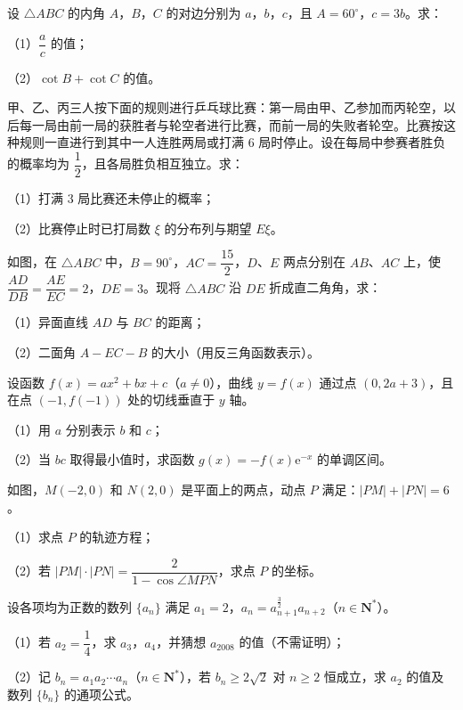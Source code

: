 \begin{question}
设 $\triangle ABC$ 的内角 $A$，$B$，$C$ 的对边分别为 $a$，$b$，$c$，且 $A=60^\circ$，$c=3b$。求：

（1）$\dfrac ac$ 的值；

（2）$\cot B+\cot C$ 的值。

\end{question}
\begin{question}
甲、乙、丙三人按下面的规则进行乒乓球比赛：第一局由甲、乙参加而丙轮空，以后每一局由前一局的获胜者与轮空者进行比赛，而前一局的失败者轮空。比赛按这种规则一直进行到其中一人连胜两局或打满 $6$ 局时停止。设在每局中参赛者胜负的概率均为 $\dfrac12$，且各局胜负相互独立。求：

（1）打满 $3$ 局比赛还未停止的概率；

（2）比赛停止时已打局数 $\xi$ 的分布列与期望 $E\xi$。

\Needspace{0.4\textheight}
\end{question}
\begin{question}
如图，在 $\triangle ABC$ 中，$B=90^\circ$，$AC=\dfrac{15}2$，$D$、$E$ 两点分别在 $AB$、$AC$ 上，使 $\dfrac{AD}{DB}=\dfrac{AE}{EC}=2$，$DE=3$。现将 $\triangle ABC$ 沿 $DE$ 折成直二角角，求：

（1）异面直线 $AD$ 与 $BC$ 的距离；

（2）二面角 $A-EC-B$ 的大小（用反三角函数表示）。
\nopagebreak[4]
\begin{center}\end{center}
\nopagebreak[4]
\end{question}
\begin{question}
设函数 $f(x)=ax^2+bx+c$（$a\neq0$），曲线 $y=f(x)$ 通过点 $(0,2a+3)$，且在点 $(-1,f(-1))$ 处的切线垂直于 $y$ 轴。

（1）用 $a$ 分别表示 $b$ 和 $c$；

（2）当 $bc$ 取得最小值时，求函数 $g(x)=-f(x)\mathrm e^{-x}$ 的单调区间。

\Needspace{0.4\textheight}
\end{question}
\begin{question}
如图，$M(-2,0)$ 和 $N(2,0)$ 是平面上的两点，动点 $P$ 满足：$|PM|+|PN|=6$。

（1）求点 $P$ 的轨迹方程；

（2）若 $|PM|\cdot|PN|=\dfrac2{1-\cos\angle MPN}$，求点 $P$ 的坐标。
\nopagebreak[4]
\begin{center}\end{center}
\nopagebreak[4]
\end{question}
\begin{question}
设各项均为正数的数列 $\{a_n\}$ 满足 $a_1=2$，$a_n=a_{n+1}^{\frac32}a_{n+2}$（$n\in\mathbf N^*$）。

（1）若 $a_2=\dfrac14$，求 $a_3$，$a_4$，并猜想 $a_{2008}$ 的值（不需证明）；

（2）记 $b_n=a_1a_2\cdots a_n$（$n\in\mathbf N^*$），若 $b_n\geqslant2\sqrt2$ 对 $n\geqslant2$ 恒成立，求 $a_2$ 的值及数列 $\{b_n\}$ 的通项公式。

\end{question}